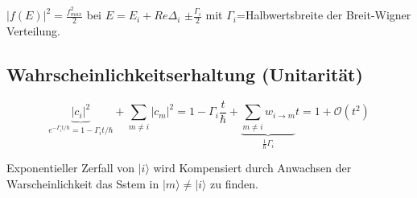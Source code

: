 \(|f(E)|^2=\frac{f^2_{max}}{2}\) bei \(E=E_i + Re\Delta_i\) \(\pm\frac{\Gamma_i}{2}\) mit \(\Gamma_i\)=Halbwertsbreite der Breit-Wigner Verteilung.



\subsection{Wahrscheinlichkeitserhaltung (Unitarität)}

\[\underbrace{|c_i|^2}_{e^{-\Gamma_it/\hbar}=1-\Gamma_it/\hbar} + \sum_{m\neq i}|c_m|^2 = 1 - \Gamma_i\frac{t}{\hbar}+\underbrace{\sum_{m\neq i}w_{i\to m}}_{\frac{1}{\hbar}\Gamma_i}t=1+\mathcal O(t^2)\]

Exponentieller Zerfall von \(|i\rangle \) wird Kompensiert durch Anwachsen der Warscheinlichkeit das Sstem in \(|m\rangle \neq |i\rangle \) zu finden.



